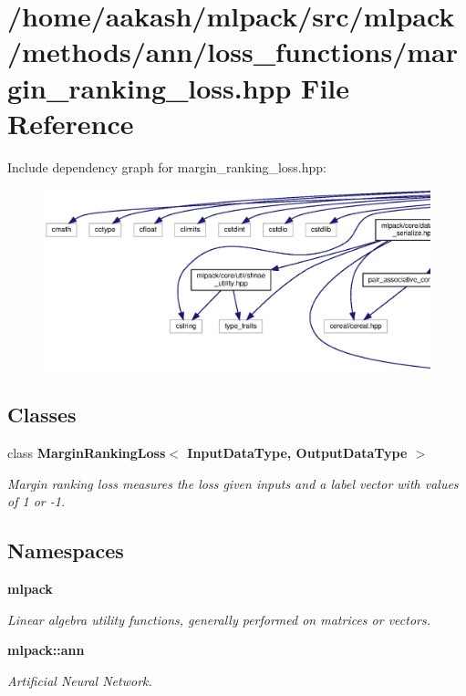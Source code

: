 \section{/home/aakash/mlpack/src/mlpack/methods/ann/loss\+\_\+functions/margin\+\_\+ranking\+\_\+loss.hpp File Reference}
\label{margin__ranking__loss_8hpp}
Include dependency graph for margin\+\_\+ranking\+\_\+loss.\+hpp\+:
\nopagebreak
\begin{figure}[H]
\begin{center}
\leavevmode
\includegraphics[width=350pt]{margin__ranking__loss_8hpp__incl}
\end{center}
\end{figure}
\subsection*{Classes}
\begin{DoxyCompactItemize}
\item 
class \textbf{ Margin\+Ranking\+Loss$<$ Input\+Data\+Type, Output\+Data\+Type $>$}
\begin{DoxyCompactList}\small\item\em Margin ranking loss measures the loss given inputs and a label vector with values of 1 or -\/1. \end{DoxyCompactList}\end{DoxyCompactItemize}
\subsection*{Namespaces}
\begin{DoxyCompactItemize}
\item 
 \textbf{ mlpack}
\begin{DoxyCompactList}\small\item\em Linear algebra utility functions, generally performed on matrices or vectors. \end{DoxyCompactList}\item 
 \textbf{ mlpack\+::ann}
\begin{DoxyCompactList}\small\item\em Artificial Neural Network. \end{DoxyCompactList}\end{DoxyCompactItemize}


